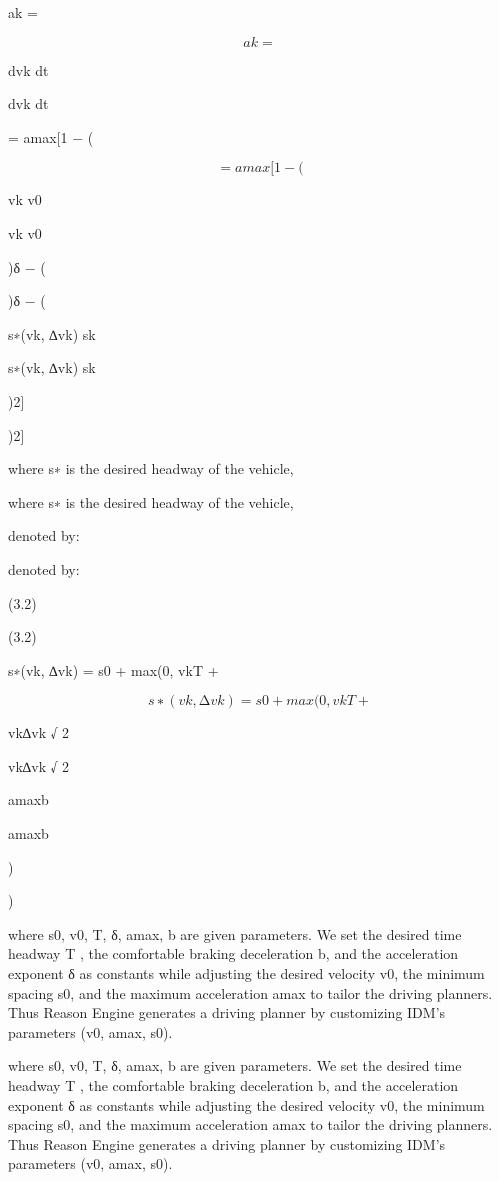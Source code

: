 \documentclass[12pt]{article}
\begin{document}
ak =


\begin{equation}
ak =
\end{equation}


dvk
dt


dvk
dt


= amax[1 − (


\begin{equation}
= amax[1 − (
\end{equation}


vk
v0


vk
v0


)δ − (


)δ − (


s∗(vk, ∆vk)
sk


s∗(vk, ∆vk)
sk


)2]


)2]


where s∗ is the desired headway of the vehicle,


where s∗ is the desired headway of the vehicle,


denoted by:


denoted by:


(3.2)


(3.2)


s∗(vk, ∆vk) = s0 + max(0, vkT +


\begin{equation}
s∗(vk, ∆vk) = s0 + max(0, vkT +
\end{equation}


vk∆vk
√
2


vk∆vk
√
2


amaxb


amaxb


)


)


where s0, v0, T, δ, amax, b are given parameters. We
set the desired time headway T , the comfortable braking
deceleration b, and the acceleration exponent δ as
constants while adjusting the desired velocity v0, the
minimum spacing s0, and the maximum acceleration
amax to tailor the driving planners. Thus Reason
Engine generates a driving planner by customizing
IDM’s parameters (v0, amax, s0).


where s0, v0, T, δ, amax, b are given parameters. We
set the desired time headway T , the comfortable braking
deceleration b, and the acceleration exponent δ as
constants while adjusting the desired velocity v0, the
minimum spacing s0, and the maximum acceleration
amax to tailor the driving planners. Thus Reason
Engine generates a driving planner by customizing
IDM’s parameters (v0, amax, s0).
\end{document}
